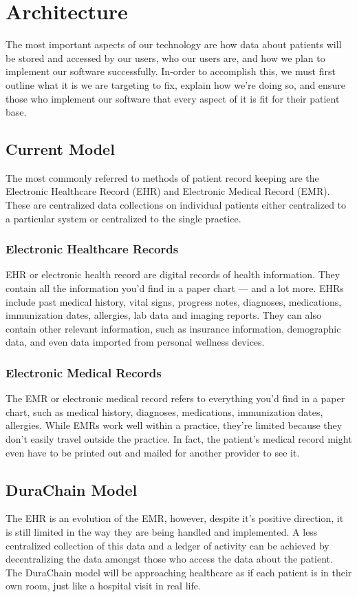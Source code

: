 \documentclass[12pt]{article}
\begin{document}
\section{Architecture}
The most important aspects of our technology are how data about patients will be stored and accessed by our users, who our users are, and how we plan to implement our software successfully. In-order to accomplish this, we must first outline what it is we are targeting to fix, explain how we’re doing so, and ensure those who implement our software that every aspect of it is fit for their patient base.

  \subsection{Current Model}
  The most commonly referred to methods of patient record keeping are the Electronic Healthcare Record (EHR) and Electronic Medical Record (EMR). These are centralized data collections on individual patients either centralized to a particular system or centralized to the single practice.

    \subsubsection{Electronic Healthcare Records}
    EHR or electronic health record are digital records of health information. They contain all the information you’d find in a paper chart — and a lot more. EHRs include past medical history, vital signs, progress notes, diagnoses, medications, immunization dates, allergies, lab data and imaging reports. They can also contain other relevant information, such as insurance information, demographic data, and even data imported from personal wellness devices.

    \subsubsection{Electronic Medical Records}
    The EMR or electronic medical record refers to everything you’d find in a paper chart, such as medical history, diagnoses, medications, immunization dates, allergies. While EMRs work well within a practice, they’re limited because they don’t easily travel outside the practice. In fact, the patient’s medical record might even have to be printed out and mailed for another provider to see it.

  \subsection{DuraChain Model}
  The EHR is an evolution of the EMR, however, despite it’s positive direction, it is still limited in the way they are being handled and implemented. A less centralized collection of this data and a ledger of activity can be achieved by decentralizing the data amongst those who access the data about the patient. The DuraChain model will be approaching healthcare as if each patient is in their own room, just like a hospital visit in real life.  
\end{document}
